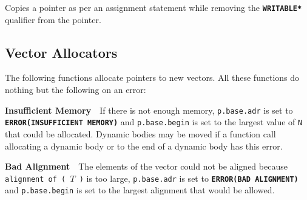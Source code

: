 \documentclass[12pt]{article}
\newcommand{\TT}[1]{{\tt \bfseries #1}}
\newcommand{\EOL}{\penalty \exhyphenpenalty}
\newenvironment{indpar}[1][0.3in]%
	{\begin{list}{}%
		     {\setlength{\itemsep}{0in}%
		      \setlength{\topsep}{0in}%
		      \setlength{\parsep}{1ex}%
		      \setlength{\labelwidth}{#1}%
		      \setlength{\leftmargin}{#1}%
		      \addtolength{\leftmargin}{\labelsep}}%
	 \item}%
	{\end{list}}
\begin{document}
\begin{indpar}
Copies a pointer as per an assignment statement while removing the
\TT{*WRITABLE*} qualifier from the pointer.
\end{indpar}

\subsection{Vector Allocators}
\label{VECTOR-ALLOCATORS}


The following functions allocate pointers to new vectors.
All these functions do nothing but the following on an error:
\begin{indpar}
{\bf Insufficient Memory}~~If there is not enough memory,
{\tt p.base.adr} is set to \TT{ERROR(\EOL IN\-SUF\-FI\-CIENT MEMORY)}
and {\tt p.base.begin} is set to the largest value of {\tt N}
that could be allocated.  Dynamic bodies may be moved if
a function call allocating a dynamic body or to the end of a dynamic
body has this error.

{\bf Bad Alignment}~~The elements of the vector could not be
aligned because {\tt alignment of ( $T$ )} is too large,
{\tt p.base.adr} is set to \TT{ERROR(BAD ALIGNMENT)}
and {\tt p.base\EOL .begin} is set to the largest alignment
that would be allowed.

\end{indpar}
\end{document}
